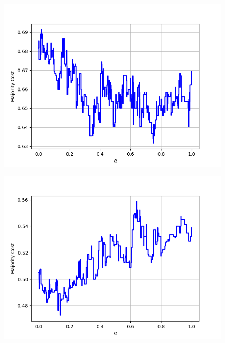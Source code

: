 \begin{figure}[h]
\begin{minipage}{.19\textwidth}
  {\includegraphics[width=\linewidth]{plots/omniglot-intra-ac-cnn/Arcadian}}
\end{minipage}
\begin{minipage}{.19\textwidth}
  \centering
  {\includegraphics[width=\linewidth]{plots/omniglot-intra-ac-cnn/Armenian}}
\end{minipage}
\begin{minipage}{.19\textwidth}
  \centering

\end{minipage}
\end{figure}
